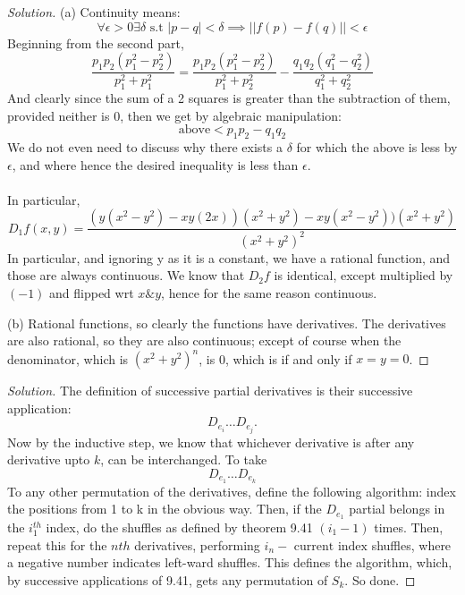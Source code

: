 \documentclass{article}
\newenvironment{problem}[2][Problem]{\begin{trivlist}
\item[\hskip \labelsep {\bfseries #1}\hskip \labelsep {\bfseries #2.}]}{\end{trivlist}}
\newenvironment{solution}{\begin{proof}[Solution]}{\end{proof}}
\begin{document}
\begin{solution}
	(a)	Continuity means: \[
		\forall \epsilon > 0 \exists \delta \text{ s.t } |p-q|<\delta \implies ||f(p)-f(q)||<\epsilon    
	\]
	Beginning from the second part, \[
		\frac{p_{1}p_{2}(p_{1}^{2}-p_{2}^{2})}{p_{1}^{2}+p_{1}^{2}}   = \frac{p_1 p_2(p_{1}^{2}-p_{2}^{2})}{p_{1}^{2}+p_{2}^{2}}- \frac{q_1 q_2(q_{1}^{2}-q_{2}^{2})}{q_{1}^{2}+q_{2}^{2}}   	
	\]
	And clearly since the sum of a 2 squares is greater than the subtraction of them, provided neither is 0, then we get by algebraic manipulation:
	\[
		\text{above}< p_1 p_2 - q_1 q_2
		\]
		We do not even need to discuss why there exists a $\delta$ for which the above is less by $\epsilon$, and where hence the desired inequality is less than $\epsilon$.
\\ \\
In particular, \[
	D_{1}f(x,y) = \frac{(y(x^{2}-y^{2})-xy(2x))(x^{2}+y^{2})- xy(x^{2}-y^{2}))(x^{2}+y^{2})}{(x^{2}+y^{2})^{2}}   
\]
In particular, and ignoring y as it is a constant, we have a rational function, and those are always continuous. We know that $D_{2}f$ is identical, except multiplied by $(-1)$ and flipped wrt $x \& y$, hence for the same reason continuous.

(b) Rational functions, so clearly the functions have derivatives. The derivatives are also rational, so they are also continuous; except of course when the denominator, which is $(x^{2}+y^{2})^{n}$, is 0, which is if and only if $x=y=0$. 
\end{solution}
\begin{problem}{9.29}
\end{problem}
\begin{solution}
	The definition of successive partial derivatives is their successive application: \[
		D_{e_{i}}\dots D_{e_{j}}.
	\]
	Now by the inductive step, we know that whichever derivative is after any derivative upto $k$, can be interchanged. To take \[
		D_{e_{1}}\dots D_{e_{k}}
	\] To any other permutation of the derivatives, define the following algorithm: index the positions from 1 to k in the obvious way. Then, if the $D_{e_{1}}$ partial belongs in the $i_{1}^{th}$ index, do the shuffles as defined by theorem 9.41 $(i_{1}-1)$ times. Then, repeat this for the $nth$ derivatives, performing $i_{n}- \text{ current index}$ shuffles, where a negative number indicates left-ward shuffles. This defines the algorithm, which, by successive applications of 9.41, gets any permutation of $S_{k}$. So done.

\end{solution}
\end{document}
